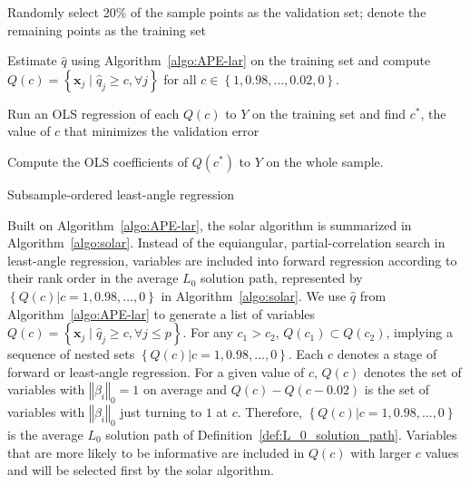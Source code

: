 \documentclass[11pt,review,authoryear]{elsarticle}
\begin{document}


\begin{algorithm}[h]


  \smallskip
  Randomly select 20\% of the sample points as the validation set; denote the remaining points as the training set\;

  Estimate $\widehat{q}$ using Algorithm~\ref{algo:APE-lar} on the training set and compute $Q(c) = \left\{ \mathbf{x}_j \; \vert \; \widehat{q}_j \geqslant c, \forall j\right\}$ for all $c \in \left\{ 1, 0.98, \ldots, 0.02, 0 \right\}.$

  Run an OLS regression of each $Q(c)$ to $Y$ on the training set and find $c^*$, the value of $c$ that minimizes the validation error\;

  Compute the OLS coefficients of $Q(c^*)$ to $Y$ on the whole sample.

  \caption{Subsample-ordered least-angle regression \label{algo:solar}}
\end{algorithm}

Built on Algorithm~\ref{algo:APE-lar}, the solar algorithm is summarized in Algorithm~\ref{algo:solar}. Instead of the equiangular, partial-correlation search in least-angle regression, variables are included into forward regression according to their rank order in the average $L_0$ solution path, represented by $\left\{ Q(c) \vert c = 1, 0.98, \ldots, 0\right\}$ in Algorithm~\ref{algo:solar}. We use $\widehat{q}$ from Algorithm~\ref{algo:APE-lar} to generate a list of variables $Q \left( c \right) = \left\{ \mathbf{x}_j \; \vert \; \widehat{q}_j \geqslant c, \forall j \leqslant p \right\}$. For any $c_1 > c_2$, $Q\left(c_1\right) \subset Q\left(c_2\right)$, implying a sequence of nested sets $\left\{ Q(c) \vert c = 1, 0.98, \ldots, 0\right\}$. Each $c$ denotes a stage of forward or least-angle regression. For a given value of $c$, $Q(c)$ denotes the set of variables with $\left\Vert \beta_i \right\Vert_0=1$ on average and $Q(c) - Q(c - 0.02)$ is the set of variables with $\left\Vert \beta_i \right\Vert_0$ just turning to $1$ at $c$. Therefore, $\left\{ Q(c) \vert c = 1, 0.98, \ldots, 0\right\}$ is the average $L_0$ solution path of Definition~\ref{def:L_0_solution_path}. Variables that are more likely to be informative are included in $Q(c)$ with larger $c$ values and will be selected first by the solar algorithm.
\end{document}
